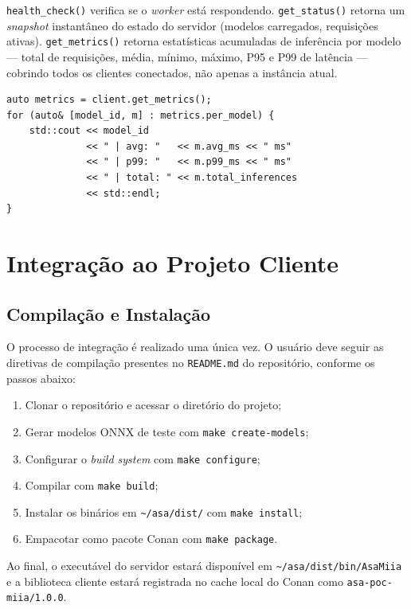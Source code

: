 \texttt{health\_check()} verifica se o \textit{worker} está respondendo. \texttt{get\_status()} retorna um \textit{snapshot} instantâneo do estado do servidor (modelos carregados, requisições ativas). \texttt{get\_metrics()} retorna estatísticas acumuladas de inferência por modelo --- total de requisições, média, mínimo, máximo, P95 e P99 de latência --- cobrindo todos os clientes conectados, não apenas a instância atual.

\begin{lstlisting}[style=vscode]
auto metrics = client.get_metrics();
for (auto& [model_id, m] : metrics.per_model) {
    std::cout << model_id
              << " | avg: "   << m.avg_ms << " ms"
              << " | p99: "   << m.p99_ms << " ms"
              << " | total: " << m.total_inferences
              << std::endl;
}
\end{lstlisting}

\section{Integração ao Projeto Cliente}

\subsection{Compilação e Instalação}

O processo de integração é realizado uma única vez. O usuário deve seguir as diretivas de compilação presentes no \texttt{README.md} do repositório, conforme os passos abaixo:

\begin{enumerate}
    \item Clonar o repositório e acessar o diretório do projeto;
    \item Gerar modelos ONNX de teste com \texttt{make create-models};
    \item Configurar o \textit{build system} com \texttt{make configure};
    \item Compilar com \texttt{make build};
    \item Instalar os binários em \texttt{\textasciitilde/asa/dist/} com \texttt{make install};
    \item Empacotar como pacote Conan com \texttt{make package}.
\end{enumerate}

Ao final, o executável do servidor estará disponível em \texttt{\textasciitilde/asa/dist/bin/AsaMiia} e a biblioteca cliente estará registrada no cache local do Conan como \texttt{asa-poc-miia/1.0.0}.

